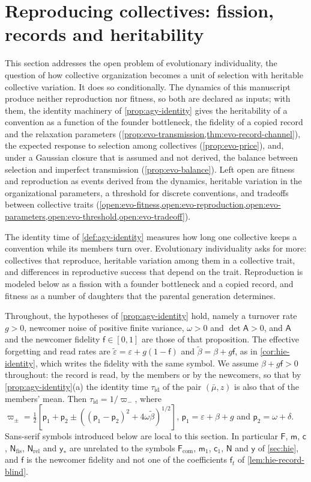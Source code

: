 \section{Reproducing collectives: fission, records and heritability}\label{sec:evo}

This section addresses the open problem of evolutionary individuality, the question of how collective organization becomes a unit of selection with heritable collective variation. It does so conditionally. The dynamics of this manuscript produce neither reproduction nor fitness, so both are declared as inputs; with them, the identity machinery of \cref{prop:agy-identity} gives the heritability of a convention as a function of the founder bottleneck, the fidelity of a copied record and the relaxation parameters (\cref{prop:evo-transmission,thm:evo-record-channel}), the expected response to selection among collectives (\cref{prop:evo-price}), and, under a Gaussian closure that is assumed and not derived, the balance between selection and imperfect transmission (\cref{prop:evo-balance}). Left open are fitness and reproduction as events derived from the dynamics, heritable variation in the organizational parameters, a threshold for discrete conventions, and tradeoffs between collective traits (\cref{open:evo-fitness,open:evo-reproduction,open:evo-parameters,open:evo-threshold,open:evo-tradeoff}).

The identity time of \cref{def:agy-identity} measures how long one collective keeps a convention while its members turn over. Evolutionary individuality asks for more: collectives that reproduce, heritable variation among them in a collective trait, and differences in reproductive success that depend on the trait. Reproduction is modeled below as a fission with a founder bottleneck and a copied record, and fitness as a number of daughters that the parental generation determines.

Throughout, the hypotheses of \cref{prop:agy-identity} hold, namely a turnover rate $g>0$, newcomer noise of positive finite variance, $\omega>0$ and $\det\mathsf A>0$, and $\mathsf A$ and the newcomer fidelity $\mathsf f\in[0,1]$ are those of that proposition. The effective forgetting and read rates are $\tilde\varepsilon=\varepsilon+g(1-\mathsf f)$ and $\tilde\beta=\beta+g\mathsf f$, as in \cref{cor:hie-identity}, which writes the fidelity with the same symbol. We assume $\beta+g\mathsf f>0$ throughout: the record is read, by the members or by the newcomers, so that by \cref{prop:agy-identity}(a) the identity time $\tau_{\mathrm{id}}$ of the pair $(\bar\mu,z)$ is also that of the members' mean. Then $\tau_{\mathrm{id}}=1/\varpi_-$, where $\varpi_\pm=\frac12[\mathsf p_1+\mathsf p_2\pm((\mathsf p_1-\mathsf p_2)^2+4\omega\tilde\beta)^{1/2}]$, $\mathsf p_1=\varepsilon+\beta+g$ and $\mathsf p_2=\omega+\delta$. Sans-serif symbols introduced below are local to this section. In particular $\mathsf F$, $\mathsf m$, $\mathsf c$, $\mathsf N_{\mathrm{fis}}$, $\mathsf N_{\mathrm{rel}}$ and $\mathsf y_\ast$ are unrelated to the symbols $\mathsf F_{\mathrm{com}}$, $\mathsf m_1$, $\mathsf c_1$, $\mathsf N$ and $\mathsf y$ of \cref{sec:hie}, and $\mathsf f$ is the newcomer fidelity and not one of the coefficients $\mathsf f_t$ of \cref{lem:hie-record-blind}.

